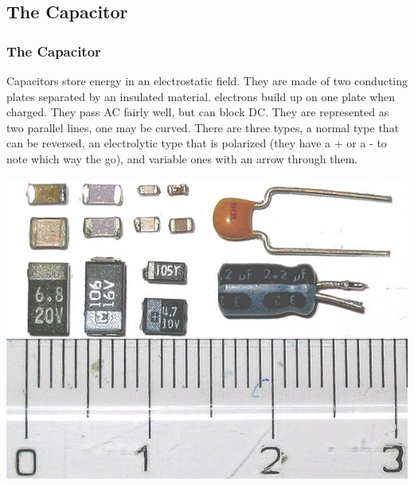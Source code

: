 \documentclass[10pt]{beamer}
\begin{document}
\subsection{The Capacitor}
\begin{frame}
\frametitle{The Capacitor}
Capacitors store energy in an electrostatic field. They are made of two conducting plates separated by an insulated material. electrons build up on one plate when charged. They pass AC fairly well, but can block DC. They are represented as two parallel lines, one may be curved. There are three types, a normal type that can be reversed, an electrolytic type that is polarized (they have a + or a - to note which way the go), and variable ones with an arrow through them.\\\pause
\begin{center}
\includegraphics[height=.5\textheight]{capacitor.jpg}
\end{center}
\end{frame}
\end{document}
